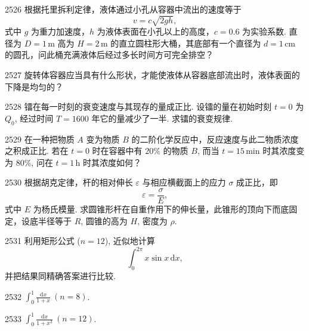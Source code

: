 \begin{prob}[M]{2526}
根据托里拆利定律，液体通过小孔从容器中流出的速度等于
\[
v = c\sqrt{2gh},
\]
式中 $g$ 为重力加速度，$h$ 为液体表面在小孔以上的高度，$c = 0.6$ 为实验系数. 直径为 $D = 1\,\mathrm{m}$ 高为 $H = 2\,\mathrm{m}$ 的直立圆柱形大桶，其底部有一个直径为 $d = 1\,\mathrm{cm}$ 的圆孔，问此桶充满液体后经过多长时间方可完全排空？
\end{prob}

\begin{prob}[M]{2527}
旋转体容器应当具有什么形状，才能使液体从容器底部流出时，液体表面的下降是均匀的？
\end{prob}

\begin{prob}[M]{2528}
镭在每一时刻的衰变速度与其现存的量成正比. 设镭的量在初始时刻 $t = 0$ 为 $Q_0$, 经过时间 $T = 1600$ 年它的量减少了一半. 求镭的衰变规律.
\end{prob}

\begin{prob}[M]{2529}
在一种把物质 $A$ 变为物质 $B$ 的二阶化学反应中，反应速度与此二物质浓度之积成正比. 若在 $t = 0$ 时在容器中有 $20\%$ 的物质 $B$, 而当 $t = 15\,\mathrm{min}$ 时其浓度变为 $80\%$, 问在 $t = 1\,\mathrm{h}$ 时其浓度如何？
\end{prob}

\begin{prob}[M]{2530}
根据胡克定律，杆的相对伸长 $\varepsilon$ 与相应横截面上的应力 $\sigma$ 成正比，即
\[
\varepsilon = \frac{\sigma}{E},
\]
式中 $E$ 为杨氏模量. 求圆锥形杆在自重作用下的伸长量，此锥形的顶向下而底固定，设底半径等于 $R$, 圆锥的高为 $H$, 密度为 $\rho$.
\end{prob}


\begin{prob}[M]{2531}
利用矩形公式 ($n = 12$), 近似地计算
\[
\int_0^{2\pi} x\sin x\,\mathrm{d}x,
\]
并把结果同精确答案进行比较.
\end{prob}


\begin{prob}[S]{2532}
$\displaystyle \int_0^1 \frac{\mathrm{d}x}{1+x} \ (n = 8)$.
\end{prob}

\begin{prob}[S]{2533}
$\displaystyle \int_0^1 \frac{\mathrm{d}x}{1+x^3} \ (n = 12)$.
\end{prob}

